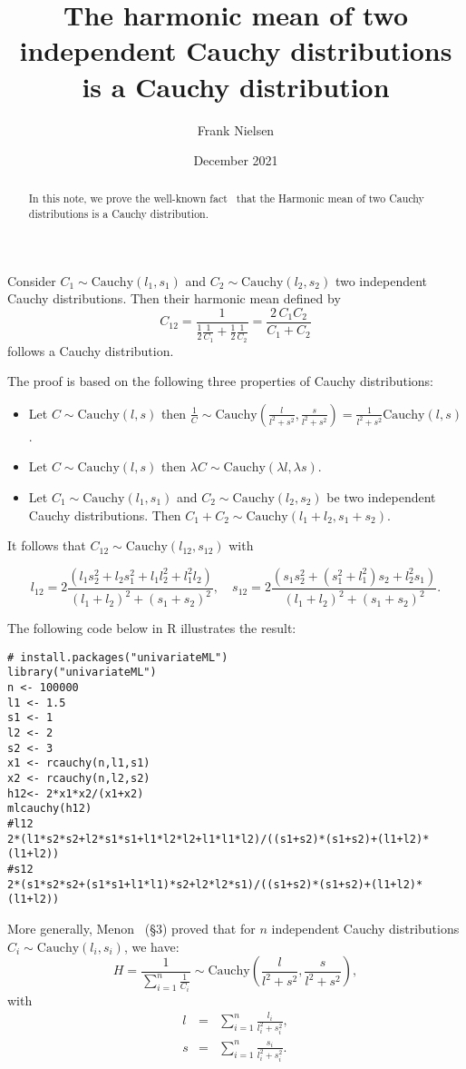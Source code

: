 \documentclass[11pt]{article}
\title{The harmonic mean of two independent Cauchy distributions is a Cauchy distribution}
\author{Frank Nielsen}
\date{December 2021}
\def\Cauchy{\mathrm{Cauchy}}
\begin{document}
\maketitle

\begin{abstract}
In this note, we prove the well-known fact~\cite{menon1962characterization} that the Harmonic mean of two Cauchy distributions is a Cauchy distribution.
\end{abstract}

Consider $C_1\sim\Cauchy(l_1,s_1)$ and $C_2\sim\Cauchy(l_2,s_2)$ two independent Cauchy distributions.
Then their harmonic mean defined by
$$
C_{12}=\frac{1}{\frac{1}{2}\frac{1}{C_1}+\frac{1}{2}\frac{1}{C_2}}=\frac{2\, C_1C_2}{C_1+C_2}
$$
follows a Cauchy distribution.

The proof is based on the following three properties of Cauchy distributions:
\begin{itemize}
	\item Let $C\sim\Cauchy(l,s)$ then $\frac{1}{C}\sim\Cauchy\left(\frac{l}{l^2+s^2},\frac{s}{l^2+s^2}\right)=\frac{1}{l^2+s^2}\Cauchy(l,s)$.
	
	\item Let $C\sim\Cauchy(l,s)$ then $\lambda C\sim\Cauchy(\lambda l,\lambda s)$.
	
	\item Let $C_1\sim\Cauchy(l_1,s_1)$ and $C_2\sim\Cauchy(l_2,s_2)$ be two independent Cauchy distributions.
Then $C_1+C_2\sim\Cauchy(l_1+l_2,s_1+s_2)$.
\end{itemize}

It follows that $C_{12}\sim\Cauchy(l_{12},s_{12})$ with

$$
l_{12}=2\frac{(l_1s_2^2+l_2s_1^2+l_1l_2^2+l_1^2l_2)}{(l_1+l_2)^2+(s_1+s_2)^2},
\quad
s_{12}=2\frac{(s_1s_2^2+(s_1^2+l_1^2)s_2+l_2^2s_1)}{(l_1+l_2)^2+(s_1+s_2)^2}.
$$

The following code below in R illustrates the result:
{\small
\begin{verbatim}
# install.packages("univariateML")
library("univariateML")
n <- 100000
l1 <- 1.5
s1 <- 1
l2 <- 2
s2 <- 3
x1 <- rcauchy(n,l1,s1)
x2 <- rcauchy(n,l2,s2)
h12<- 2*x1*x2/(x1+x2)
mlcauchy(h12)
#l12
2*(l1*s2*s2+l2*s1*s1+l1*l2*l2+l1*l1*l2)/((s1+s2)*(s1+s2)+(l1+l2)*(l1+l2))
#s12
2*(s1*s2*s2+(s1*s1+l1*l1)*s2+l2*l2*s1)/((s1+s2)*(s1+s2)+(l1+l2)*(l1+l2))
\end{verbatim}
}

More generally, Menon~\cite{menon1962characterization} (\S 3) proved that for $n$ independent Cauchy distributions $C_i\sim \Cauchy(l_i,s_i)$, we have:
$$
H=\frac{1}{\sum_{i=1}^n \frac{1}{C_i}}\sim \Cauchy\left(\frac{l}{l^2+s^2},\frac{s}{l^2+s^2}\right),
$$
with
\begin{eqnarray*}
l &=& \sum_{i=1}^n \frac{l_i}{l_i^2+s_i^2},\\
s &=& \sum_{i=1}^n \frac{s_i}{l_i^2+s_i^2}.
\end{eqnarray*}
\end{document}
